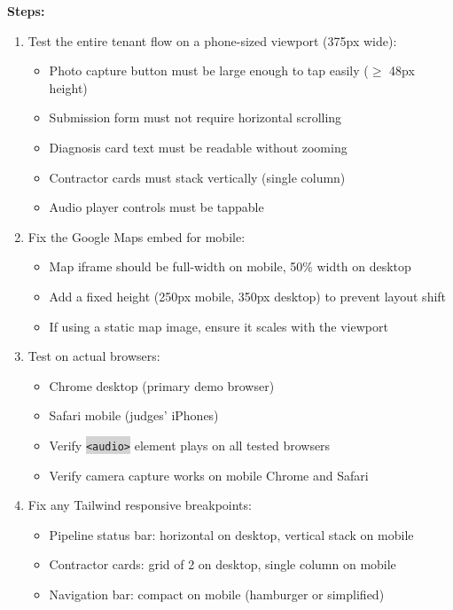 \documentclass[11pt, a4paper]{article}
\newcommand{\code}[1]{\texttt{\small\colorbox{lightgray}{#1}}}
\begin{document}
\textbf{Steps:}
\begin{enumerate}[leftmargin=2em, itemsep=2pt]
  \item Test the entire tenant flow on a phone-sized viewport (375px wide):
    \begin{itemize}[itemsep=1pt]
      \item Photo capture button must be large enough to tap easily ($\geq$ 48px height)
      \item Submission form must not require horizontal scrolling
      \item Diagnosis card text must be readable without zooming
      \item Contractor cards must stack vertically (single column)
      \item Audio player controls must be tappable
    \end{itemize}

  \item Fix the Google Maps embed for mobile:
    \begin{itemize}[itemsep=1pt]
      \item Map iframe should be full-width on mobile, 50\% width on desktop
      \item Add a fixed height (250px mobile, 350px desktop) to prevent layout shift
      \item If using a static map image, ensure it scales with the viewport
    \end{itemize}

  \item Test on actual browsers:
    \begin{itemize}[itemsep=1pt]
      \item Chrome desktop (primary demo browser)
      \item Safari mobile (judges' iPhones)
      \item Verify \code{<audio>} element plays on all tested browsers
      \item Verify camera capture works on mobile Chrome and Safari
    \end{itemize}

  \item Fix any Tailwind responsive breakpoints:
    \begin{itemize}[itemsep=1pt]
      \item Pipeline status bar: horizontal on desktop, vertical stack on mobile
      \item Contractor cards: grid of 2 on desktop, single column on mobile
      \item Navigation bar: compact on mobile (hamburger or simplified)
    \end{itemize}
\end{enumerate}
\end{document}
